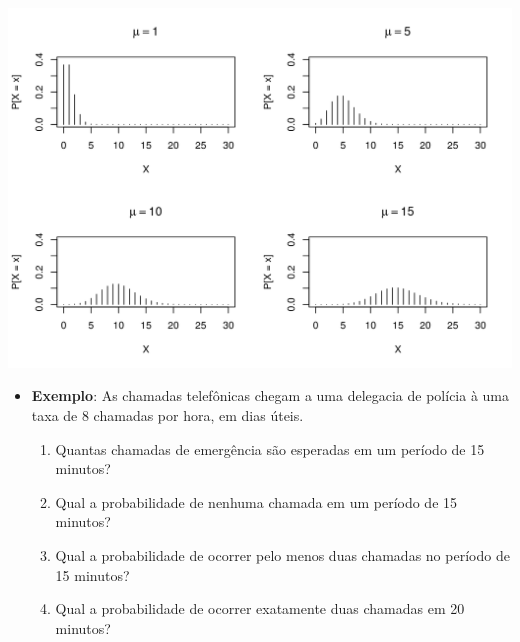 \documentclass[10pt,a4paper]{book}
\providecommand{\tightlist}{%
  \setlength{\itemsep}{0pt}\setlength{\parskip}{0pt}}
\begin{document}
\begin{center}\includegraphics{figures/unnamed-chunk-350-1} \end{center}

\begin{itemize}
\tightlist
\item
  \textbf{Exemplo}: As chamadas telefônicas chegam a uma delegacia de
  polícia à uma taxa de 8 chamadas por hora, em dias úteis.

  \begin{enumerate}
  \def\labelenumi{\alph{enumi}.}
  \tightlist
  \item
    Quantas chamadas de emergência são esperadas em um período de 15
    minutos?
  \item
    Qual a probabilidade de nenhuma chamada em um período de 15 minutos?
  \item
    Qual a probabilidade de ocorrer pelo menos duas chamadas no período
    de 15 minutos?
  \item
    Qual a probabilidade de ocorrer exatamente duas chamadas em 20
    minutos?
  \end{enumerate}
\end{itemize}
\end{document}
